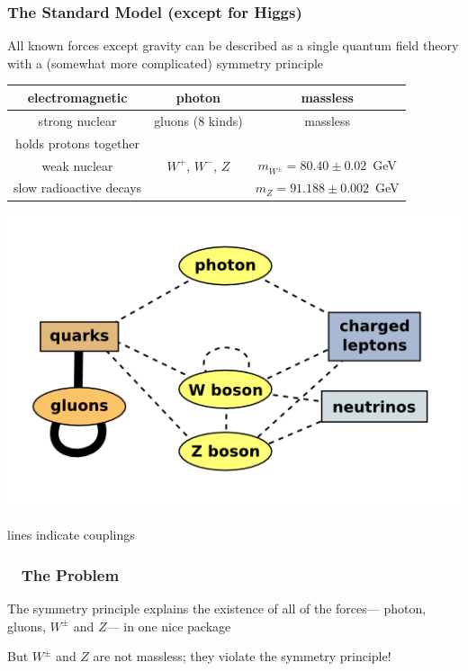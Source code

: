 \documentclass[compress]{beamer}
\begin{document}
\begin{frame}
\frametitle{The Standard Model (except for Higgs)}

All known forces except gravity can be described as a single quantum field theory with a (somewhat more complicated) symmetry principle

\begin{center}
\renewcommand{\arraystretch}{1.2}
\begin{tabular}{c c c}
electromagnetic & photon & massless \\\hline
strong nuclear & gluons (8 kinds) & massless \\
{\scriptsize holds protons together} & & \\\hline
weak nuclear & $W^+$, $W^-$, $Z$ & $m_{W^\pm} = 80.40 \pm 0.02$~GeV \\
{\scriptsize slow radioactive decays} & & $m_{Z} = 91.188 \pm 0.002$~GeV \\
\end{tabular}

\vspace{-0.5 cm}
\includegraphics[width=0.7\linewidth]{standard_model.png}
\end{center}

\vspace{-1.3 cm}
\hfill {\scriptsize lines indicate couplings}
\end{frame}

\begin{frame}
\frametitle{\mbox{ } \hfill \hfill \LARGE The Problem \hfill \mbox{ }}

\Large

The symmetry principle explains the existence of all of the forces--- photon, gluons, $W^\pm$ and $Z$--- in one nice package

\vfill
But $W^\pm$ and $Z$ are not massless; they violate the symmetry principle!
\end{frame}
\end{document}
